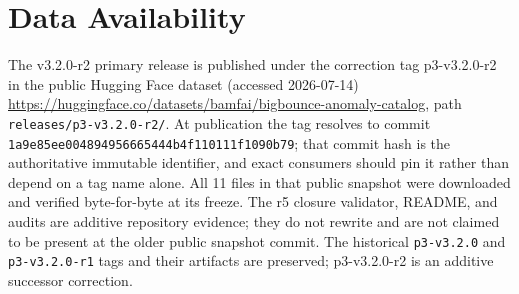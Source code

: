 \documentclass[twocolumn]{aastex701}
\newcommand{\releaseVersion}{v3.2.0-r2}
\newcommand{\releaseTag}{p3-v3.2.0-r2}
\newcommand{\releaseRevision}{1a9e85ee004894956665444b4f110111f1090b79}
\begin{document}
\section*{Data Availability}

The \releaseVersion{} primary release is published under the correction tag \releaseTag{} in the
public Hugging Face dataset (accessed 2026-07-14)
\url{https://huggingface.co/datasets/bamfai/bigbounce-anomaly-catalog}, path
\nolinkurl{releases/p3-v3.2.0-r2/}.  At publication the tag resolves to commit
\texttt{\releaseRevision}; that commit hash is the authoritative immutable identifier, and exact
consumers should pin it rather than depend on a tag name alone.  All 11 files in that public
snapshot were downloaded and verified byte-for-byte at its freeze.  The r5 closure validator,
README, and audits are additive repository evidence; they do not rewrite and are not claimed to
be present at the older public snapshot commit.  The
historical \texttt{p3-v3.2.0} and \texttt{p3-v3.2.0-r1} tags and their artifacts are preserved;
\releaseTag{} is an additive successor correction.
\end{document}
